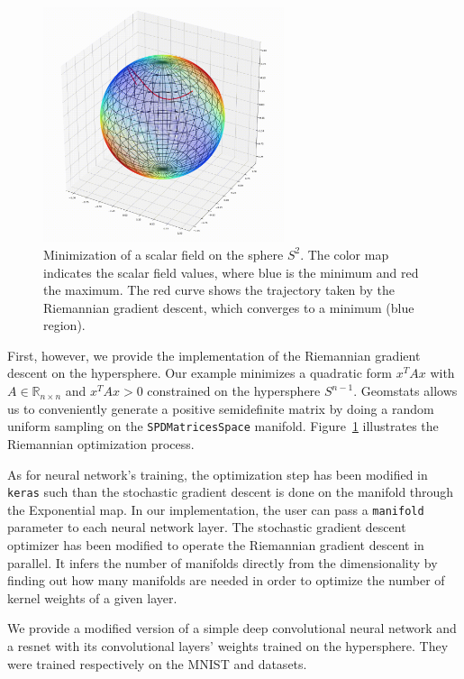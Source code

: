 \documentclass{article}
\begin{document}
\begin{figure}[h!]
\vspace{-4mm}
    \centering
    \includegraphics[width=200pt]{hypersphere.png}
    \caption{Minimization of a scalar field on the sphere $S^2$. The color map indicates the scalar field values, where blue is the minimum and red the maximum. The red curve shows the trajectory taken by the Riemannian gradient descent, which converges to a minimum (blue region).}
    \label{fig:hypersphere}
\end{figure}

First, however, we provide the implementation of the Riemannian gradient descent on the hypersphere. Our example minimizes a quadratic form $x^TAx$ with $A\in  \mathbb{R}_{n \times n}$ and $x^TAx > 0$ constrained on the hypersphere $S^{n-1}$. Geomstats allows us to conveniently generate a positive semidefinite matrix by doing a random uniform sampling on the \texttt{SPDMatricesSpace} manifold. Figure~\ref{fig:hypersphere} illustrates the Riemannian optimization process.

As for neural network's training, the optimization step has been modified in \texttt{keras} such than the stochastic gradient descent is done on the manifold through the Exponential map. In our implementation, the user can pass a \texttt{manifold} parameter to each neural network layer. The stochastic gradient descent optimizer has been modified to operate the Riemannian gradient descent in parallel. It infers the number of manifolds directly from the dimensionality by finding out how many manifolds are needed in order to optimize the number of kernel weights of a given layer.

We provide a modified version of a simple deep convolutional neural network and a resnet \cite{resnet2015} with its convolutional layers' weights trained on the hypersphere. They were trained respectively on the MNIST \cite{mnist} and \cite{cifar10} datasets.
\end{document}
